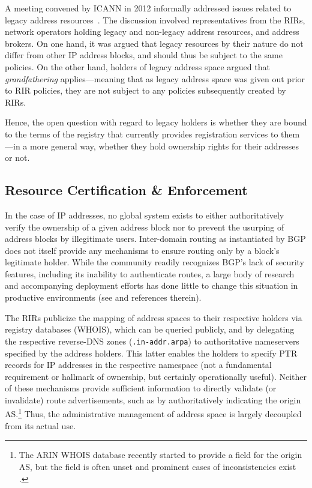 \documentclass[letter]{sigcomm-alternate}
\begin{document}
A meeting convened by ICANN
in 2012 informally addressed issues related to legacy address
resources~\cite{icann_legacy_meeting}. The discussion involved representatives
from the RIRs, network operators holding legacy and non-legacy
address resources, and address brokers.  On one hand, it was argued that legacy resources by
their nature do not differ from other IP address blocks, and should thus be
subject to the same policies.  On the other hand, holders of legacy address
space argued that \textit{grandfathering} applies---meaning that as legacy
address space was given out prior to RIR policies, they are not subject to any
policies subsequently created by RIRs.

Hence, the open question with regard to legacy holders is whether they are
bound to the terms of the registry that currently provides registration
services to them---in a more general way, whether they hold ownership rights
for their addresses or not.

\subsection{Resource Certification \& Enforcement}

In the case of IP addresses, no global system exists to either authoritatively
verify the ownership of a given address block nor to prevent the usurping of
address blocks by illegitimate users. Inter-domain routing as instantiated by
BGP does not itself provide any mechanisms to ensure routing only by a block's
legitimate holder.  While the community readily recognizes BGP's lack of
security features, including its inability to authenticate routes, a large body
of research and accompanying deployment efforts has done little to change this
situation in productive environments (see \cite{butler2010survey} and
references therein).

The RIRs publicize the mapping of address spaces to their respective holders
via registry databases (WHOIS), which can be queried publicly, and by
delegating the respective reverse-DNS zones (\texttt{.in-addr.arpa}) to
authoritative nameservers specified by the address holders. This latter enables
the holders to specify PTR records for IP addresses in the respective namespace
(not a fundamental requirement or hallmark of ownership, but certainly
operationally useful).  Neither of these mechanisms provide sufficient
information to directly validate (or invalidate) route advertisements, such as
by authoritatively indicating the origin AS.\footnote{
	The ARIN WHOIS database recently started to provide a field for
	the origin AS, but the field is often unset and prominent cases
	of inconsistencies exist \cite{pch_origin}.
}
Thus, the administrative management of address space is largely decoupled from its actual
use.
\end{document}

